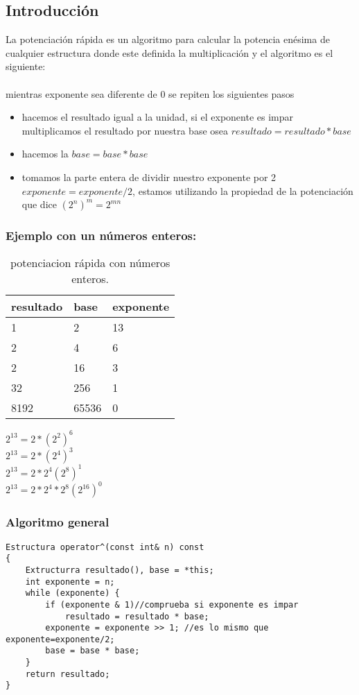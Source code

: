 \subsection{Introducción}
La potenciación rápida es un algoritmo para calcular la potencia enésima de cualquier estructura donde este definida la multiplicación y el algoritmo es el siguiente:
\\\\mientras exponente sea diferente de 0 se repiten los siguientes pasos
\begin{itemize}
\item hacemos el resultado igual a la unidad, si el exponente es impar multiplicamos el resultado por nuestra base  osea $resultado = resultado * base$
\item hacemos la $base =  base * base$
\item tomamos la parte entera de dividir nuestro exponente por 2 $exponente=exponente/2$, estamos utilizando la propiedad de la potenciación que dice $\left ( 2^{n} \right )^m=2^{mn}$
\end{itemize}

\subsubsection{Ejemplo con un números enteros:}

\begin{table}[htbp]
\begin{center}
\begin{tabular}{|l|l|l|}
\hline
resultado & base & exponente \\
\hline \hline
1 &	2 &	13 \\ \hline
2 &	4 &	6 \\ \hline
2	& 16 & 3 \\ \hline
32 &	256 &	1 \\ \hline
8192 &	65536 &	0 \\ \hline
\end{tabular}
\caption{potenciacion rápida con números enteros.}
\label{tabla:ejemplo}
\end{center}
\end{table}
$2^{13}=2*\left ( 2^{2} \right )^{6}$
\\$2^{13}=2*\left ( 2^{4} \right )^3$
\\$2^{13}=2*2^{4}\left ( 2^{8} \right )^1$
\\$2^{13}=2*2^{4}*2^{8} \left ( 2^{16} \right )^0$


\subsubsection{Algoritmo general}
\begin{minipage}{\textwidth}
\begin{lstlisting}[style=C,caption=operadorPotencia]
Estructura operator^(const int& n) const
{
    Extructurra resultado(), base = *this;
    int exponente = n;
    while (exponente) {
        if (exponente & 1)//comprueba si exponente es impar
            resultado = resultado * base;
        exponente = exponente >> 1; //es lo mismo que exponente=exponente/2;
        base = base * base;
    }
    return resultado;
}
\end{lstlisting}
\end{minipage}

